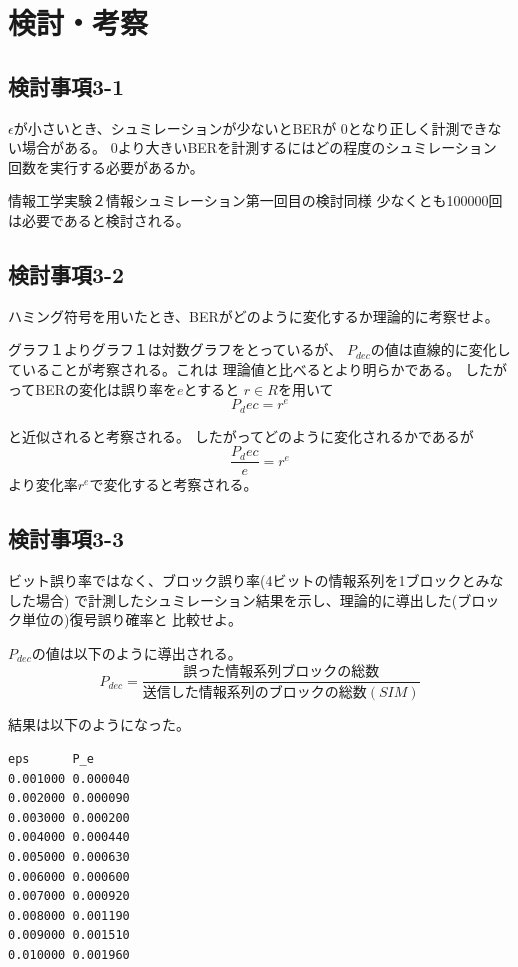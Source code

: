\documentclass{jsarticle}
\begin{document}
\section{検討・考察}
\subsection{検討事項3-1}
$\epsilon$が小さいとき、シュミレーションが少ないとBERが
0となり正しく計測できない場合がある。
0より大きいBERを計測するにはどの程度のシュミレーション
回数を実行する必要があるか。

情報工学実験２情報シュミレーション第一回目の検討同様
少なくとも100000回は必要であると検討される。

\subsection{検討事項3-2}
ハミング符号を用いたとき、BERがどのように変化するか理論的に考察せよ。

グラフ１よりグラフ１は対数グラフをとっているが、
$P_{dec}$の値は直線的に変化していることが考察される。これは
理論値と比べるとより明らかである。
したがってBERの変化は誤り率を$e$とすると
$r \in R$を用いて
$$P_dec = r^e$$

と近似されると考察される。
したがってどのように変化されるかであるが
$$\frac{P_dec}{e} = r^e$$
より変化率$r^e$で変化すると考察される。

\subsection{検討事項3-3}
ビット誤り率ではなく、ブロック誤り率(4ビットの情報系列を1ブロックとみなした場合)
で計測したシュミレーション結果を示し、理論的に導出した(ブロック単位の)復号誤り確率と
比較せよ。

$P_{dec}$の値は以下のように導出される。
$$P_{dec} = \frac{\mbox{誤った情報系列ブロックの総数}}{\mbox{送信した情報系列のブロックの総数}(SIM)}$$

結果は以下のようになった。

\begin{lstlisting}
eps      P_e
0.001000 0.000040
0.002000 0.000090
0.003000 0.000200
0.004000 0.000440
0.005000 0.000630
0.006000 0.000600
0.007000 0.000920
0.008000 0.001190
0.009000 0.001510
0.010000 0.001960
\end{lstlisting}
\end{document}
